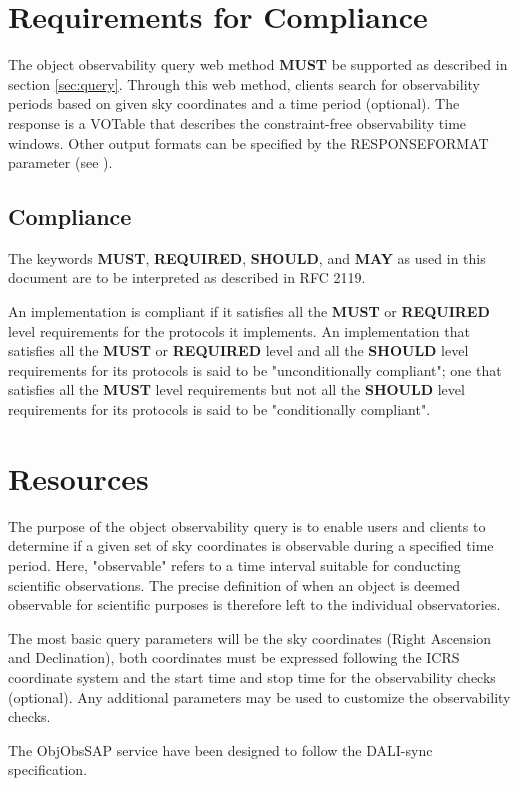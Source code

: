 \documentclass[11pt,a4paper]{ivoatex/ivoa}
\begin{document}
\section{Requirements for Compliance}
The object observability query web method \textbf{MUST} be supported as described
in section \ref{sec:query}. Through this web method, clients search for observability
periods based on given sky coordinates and a time period (optional). The
response is a VOTable that describes the constraint-free observability time
windows. Other output formats can be specified by the RESPONSEFORMAT
parameter (see \citet{2017ivoa.spec.0517D}).

\subsection{Compliance}
The keywords \textbf{MUST}, \textbf{REQUIRED}, \textbf{SHOULD},
and \textbf{MAY} as used in this document are to be interpreted as
described in RFC 2119.

An implementation is compliant if it satisfies all the \textbf{MUST}
or \textbf{REQUIRED} level requirements for the protocols it
implements. An implementation that satisfies all the \textbf{MUST} or
\textbf{REQUIRED} level and all the \textbf{SHOULD} level
requirements for its protocols is said to be "unconditionally
compliant"; one that satisfies all the \textbf{MUST} level
requirements but not all the \textbf{SHOULD} level requirements for
its protocols is said to be "conditionally compliant".

\section{Resources}
The purpose of the object observability query is to enable users and clients to
determine if a given set of sky coordinates is observable during a specified time period.
Here, "observable" refers to a time interval suitable for conducting scientific observations. 
The precise definition of when an object is deemed observable for scientific purposes is therefore left to the individual observatories.

The most basic query parameters will be the sky coordinates (Right
Ascension and Declination), both coordinates must be expressed following
the ICRS coordinate system and the start time and stop time for the
observability checks (optional). Any additional parameters may be used to
customize the observability checks.

The ObjObsSAP service have been designed to follow the DALI-sync
specification.
\end{document}
